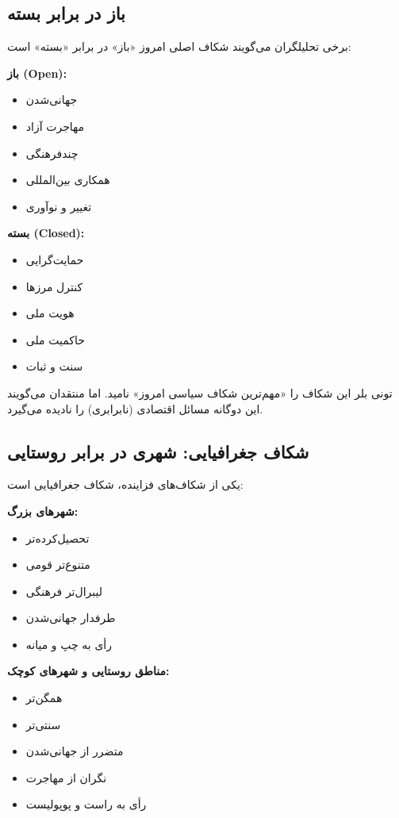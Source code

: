 \subsection{باز در برابر بسته}


برخی تحلیلگران می‌گویند شکاف اصلی امروز «باز» در برابر «بسته» است:

\textbf{باز (Open):}
\begin{itemize}
    \item جهانی‌شدن
    \item مهاجرت آزاد
    \item چندفرهنگی
    \item همکاری بین‌المللی
    \item تغییر و نوآوری
\end{itemize}

\textbf{بسته (Closed):}
\begin{itemize}
    \item حمایت‌گرایی
    \item کنترل مرزها
    \item هویت ملی
    \item حاکمیت ملی
    \item سنت و ثبات
\end{itemize}

تونی بلر این شکاف را «مهم‌ترین شکاف سیاسی امروز» نامید. اما منتقدان می‌گویند این دوگانه مسائل اقتصادی (نابرابری) را نادیده می‌گیرد.


\subsection{شکاف جغرافیایی: شهری در برابر روستایی}


یکی از شکاف‌های فزاینده، شکاف جغرافیایی است:

\textbf{شهرهای بزرگ:}
\begin{itemize}
    \item تحصیل‌کرده‌تر
    \item متنوع‌تر قومی
    \item لیبرال‌تر فرهنگی
    \item طرفدار جهانی‌شدن
    \item رأی به چپ و میانه
\end{itemize}

\textbf{مناطق روستایی و شهرهای کوچک:}
\begin{itemize}
    \item همگن‌تر
    \item سنتی‌تر
    \item متضرر از جهانی‌شدن
    \item نگران از مهاجرت
    \item رأی به راست و پوپولیست
\end{itemize}

